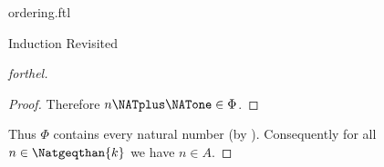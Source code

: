\documentclass{naproche-library}
\begin{document}
\begin{smodule}[title=The Standard Ordering of the Natural Numbers]{ordering.ftl}
\begin{sfragment}{Induction Revisited}
\begin{proof}[forthel]
\begin{proof}
      Therefore $n \NATplus \NATone \in \Phi$.
    \end{proof}

    Thus $\Phi$ contains every natural number (by ).
    Consequently for all $n \in \Natgeqthan{k}$ we have $n \in A$.
  \end{proof}
\end{sfragment}
\end{smodule}
\end{document}
